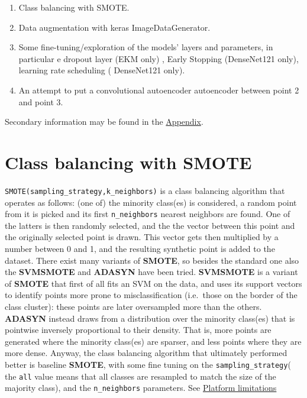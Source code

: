 \documentclass[12pt,halfline,a4paper,]{ouparticle}
\providecommand{\tightlist}{%
  \setlength{\itemsep}{0pt}\setlength{\parskip}{0pt}}
\begin{document}
\begin{enumerate}
\def\labelenumi{\arabic{enumi}.}
\tightlist
\item
  Class balancing with SMOTE.
\item
  Data augmentation with keras ImageDataGenerator.
\item
  Some fine-tuning/exploration of the models' layers and parameters, in
  particular e dropout layer (EKM only) , Early Stopping (DenseNet121
  only), learning rate scheduling ( DenseNet121 only).
\item
  An attempt to put a convolutional autoencoder autoencoder between
  point 2 and point 3.
\end{enumerate}

Secondary information may be found in the
\protect\hyperlink{appendix}{Appendix}.

\hypertarget{class-balancing-with-smote}{%
\section{Class balancing with SMOTE}\label{class-balancing-with-smote}}

\texttt{SMOTE(sampling\_strategy,k\_neighbors)} is a class balancing
algorithm that operates as follows: (one of) the minority class(es) is
considered, a random point from it is picked and its first
\texttt{n\_neighbors} nearest neighbors are found. One of the latters is
then randomly selected, and the the vector between this point and the
originally selected point is drawn. This vector gets then multiplied by
a number between 0 and 1, and the resulting synthetic point is added to
the dataset. There exist many variants of \textbf{SMOTE}, so besides the
standard one also the \textbf{SVMSMOTE} and \textbf{ADASYN} have been
tried. \textbf{SVMSMOTE} is a variant of \textbf{SMOTE} that first of
all fits an SVM on the data, and uses its support vectors to identify
points more prone to misclassification (i.e.~those on the border of the
class cluster): these points are later oversampled more than the others.
\textbf{ADASYN} instead draws from a distribution over the minority
class(es) that is pointwise inversely proportional to their density.
That is, more points are generated where the minority class(es) are
sparser, and less points where they are more dense. Anyway, the class
balancing algorithm that ultimately performed better is baseline
\textbf{SMOTE}, with some fine tuning on the
\texttt{sampling\_strategy}( the \texttt{all} value means that all
classes are resampled to match the size of the majority class), and the
\texttt{n\_neighbors} parameters. See \href{}{Platform limitations}
\end{document}
